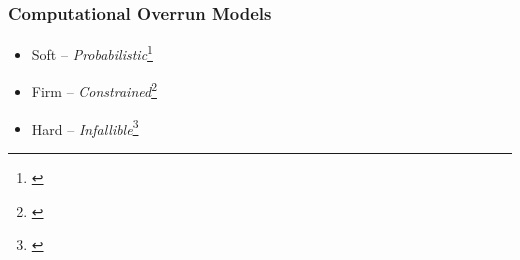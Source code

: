 \begin{frame}
\begin{minipage}{0.49\textwidth}
\begin{figure}[h]
        \end{figure}
    \end{minipage}
\end{frame}

\begin{frame}
    \frametitle{Computational Overrun Models}
    \begin{itemize}\setlength\itemsep{1em}
        \item \textcolor<2>{hicolour!50!white}{Soft -- \emph{Probabilistic}\footnote{\cite{Buttazzo:2005, Manolache:2004, vonderBrueggen:2021}}}
        \item \textcolor<2>{hicolour}{Firm -- \emph{Constrained}\footnote{\cite{Koren:1995, Bernat:2001}}}
        \item<1> Hard -- \emph{Infallible}\footnote{\cite{Liu:1973}}
    \end{itemize}
\end{frame}

